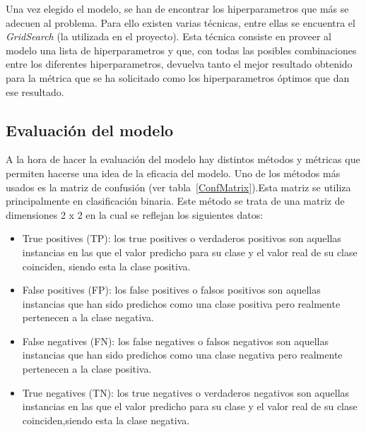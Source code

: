 Una vez elegido el modelo, se han de encontrar los hiperparametros que más se adecuen al problema. Para ello existen varias técnicas, entre ellas se encuentra el \textit{GridSearch} (la utilizada en el proyecto). Esta técnica consiste en proveer al modelo una lista de hiperparametros y que, con todas las posibles combinaciones entre los diferentes hiperparametros, devuelva tanto el mejor resultado obtenido para la métrica que se ha solicitado como los hiperparametros óptimos que dan ese resultado.




\subsection{Evaluación del modelo}


A la hora de hacer la evaluación del modelo hay distintos métodos y métricas que permiten hacerse una idea de la eficacia del modelo. Uno de los métodos más usados es la matriz de confusión (ver tabla~\ref{ConfMatrix}).Esta matriz se utiliza principalmente en clasificación binaria. Este método se trata de una matriz de dimensiones 2 x 2 en la cual se reflejan los siguientes datos:
\begin{itemize}
\item True positives (TP): los true positives o verdaderos positivos son aquellas instancias en las que el valor predicho para su clase y el valor real de su clase coinciden, siendo esta la clase positiva. 
\item False positives (FP): los false positives o falsos positivos son aquellas instancias que han sido predichos como una clase positiva pero realmente pertenecen a la clase negativa.
\item False negatives (FN): los false negatives o falsos negativos son aquellas instancias que han sido predichos como una clase negativa pero realmente pertenecen a la clase positiva.
\item True negatives (TN): los true negatives o verdaderos negativos son aquellas instancias en las que el valor predicho para su clase y el valor real de su clase coinciden,siendo esta la clase negativa. 
\end{itemize} 
